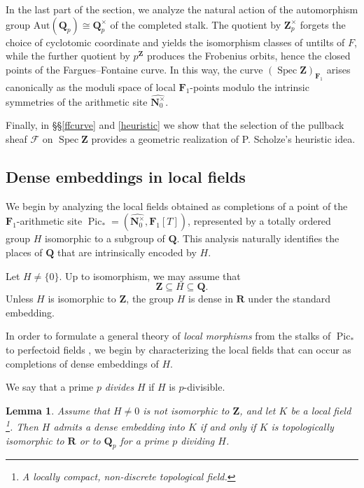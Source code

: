 \documentclass[11pt,a4paper]{article}
\newtheorem{lemma}[theorem]{Lemma}
\newcommand{\N}{\mathbf{N}}
\newcommand{\Q}{\mathbf{Q}}
\newcommand{\R}{\mathbf{R}}
\newcommand{\Z}{\mathbf{Z}}
\newcommand{\Fone}{\mathbf{F}_{1}}
\def\spz{\Spec \Z}
\def\spzf{(\Spec \Z)_{\mathbf{F}_{1}}}
\newcommand{\nato}{\widehat{\N^\times_0}}
\newcommand{\Aut}{\mathrm{Aut}}
\newcommand{\Spec}{\operatorname{Spec}}
\newcommand{\Pic}{\operatorname{Pic}} \newcommand{\Jac}{\operatorname{Jac}}
\newcommand{\picone}{{\Pic}_{*}}
\begin{document}
In the last part of the section, we analyze the natural action of the automorphism group $\Aut(\Q_p)\cong \Q_p^\times$ of the completed stalk. The quotient by $\Z_p^\times$ forgets the choice of cyclotomic coordinate and yields the isomorphism classes of untilts of $F$, while the further quotient by $p^\Z$ produces the Frobenius orbits, hence the closed points of the Fargues--Fontaine curve. In this way, the curve $\spzf$ arises canonically as the moduli space of local $\Fone$-points modulo the intrinsic symmetries of the arithmetic site $\nato$. 

 Finally, in \S\S \ref{ffcurve} and \ref{heuristic} we show that the selection of the pullback sheaf $\mathcal F$ on $\spz$ provides a geometric realization of P. Scholze's heuristic idea. 


\subsection{Dense embeddings in local fields}\label{locality}

We begin by analyzing the local fields obtained as completions of a point of the $\Fone$-arithmetic site
$
\picone=(\nato,\Fone[T])$, 
represented by a totally ordered group $H$ isomorphic to a subgroup of $\Q$. This analysis naturally identifies the places of $\Q$ that are intrinsically encoded by $H$.

Let $H\neq \{0\}$. Up to isomorphism, 
we may assume that 
\[
\Z\subseteq H\subseteq\Q.
\]
Unless $H$ is isomorphic to $\Z$, the group $H$ is dense in 
$\R$ under the standard embedding.\vspace{.03in}

In order to formulate a general theory of \emph{local morphisms} from the stalks of $\picone$ to perfectoid fields \cite{Scholze}, we begin by characterizing the local fields that can occur as completions of dense embeddings of $H$.\vspace{.03in}

We say that a prime $p$ \emph{divides} $H$ if $H$ is 
$p$-divisible.

\begin{lemma}\label{lembed}
Assume that $H\neq{0}$ is not isomorphic to $\Z$, and let $K$ be a local field \footnote{A locally compact, non-discrete topological field.}. Then $H$ admits a dense embedding into $K$ if and only if $K$ is topologically isomorphic to $\R$ or to $\Q_p$ for a prime $p$ dividing $H$.
\end{lemma}
\end{document}

